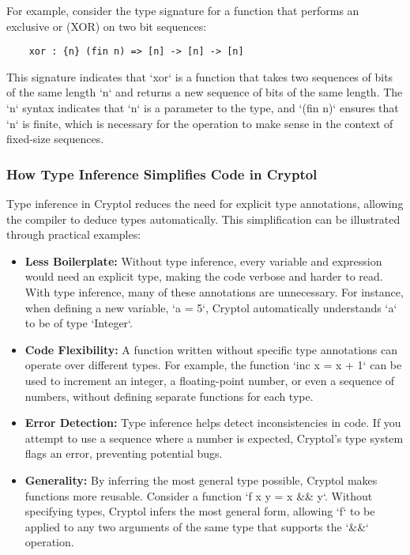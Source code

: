 For example, consider the type signature for a function that performs an exclusive or (XOR) on two bit sequences:

\begin{verbatim}
	xor : {n} (fin n) => [n] -> [n] -> [n]
\end{verbatim}

This signature indicates that `xor` is a function that takes two sequences of bits of the same length `n` and returns a new sequence of bits of the same length. The `{n}` syntax indicates that `n` is a parameter to the type, and `(fin n)` ensures that `n` is finite, which is necessary for the operation to make sense in the context of fixed-size sequences.

\subsubsection{How Type Inference Simplifies Code in Cryptol}
Type inference in Cryptol reduces the need for explicit type annotations, allowing the compiler to deduce types automatically. This simplification can be illustrated through practical examples:

\begin{itemize}
	\item \textbf{Less Boilerplate:} Without type inference, every variable and expression would need an explicit type, making the code verbose and harder to read. With type inference, many of these annotations are unnecessary. For instance, when defining a new variable, `a = 5`, Cryptol automatically understands `a` to be of type `Integer`.
	
	\item \textbf{Code Flexibility:} A function written without specific type annotations can operate over different types. For example, the function `inc x = x + 1` can be used to increment an integer, a floating-point number, or even a sequence of numbers, without defining separate functions for each type.
	
	\item \textbf{Error Detection:} Type inference helps detect inconsistencies in code. If you attempt to use a sequence where a number is expected, Cryptol's type system flags an error, preventing potential bugs.
	
	\item \textbf{Generality:} By inferring the most general type possible, Cryptol makes functions more reusable. Consider a function `f x y = x \&\& y`. Without specifying types, Cryptol infers the most general form, allowing `f` to be applied to any two arguments of the same type that supports the `\&\&` operation.
\end{itemize}


